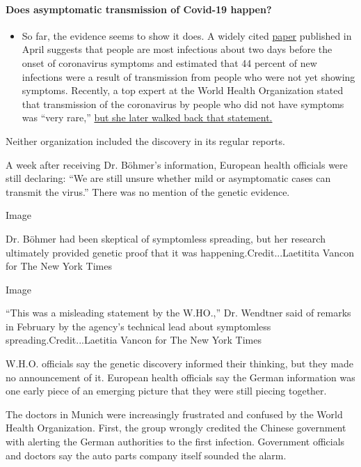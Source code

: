 \begin{itemize}
{  \paragraph{Does asymptomatic transmission of Covid-19
  happen?}\label{does-asymptomatic-transmission-of-covid-19-happen}}

  \begin{itemize}
  \tightlist
  \item
    So far, the evidence seems to show it does. A widely cited
    \href{https://www.nature.com/articles/s41591-020-0869-5}{paper}
    published in April suggests that people are most infectious about
    two days before the onset of coronavirus symptoms and estimated that
    44 percent of new infections were a result of transmission from
    people who were not yet showing symptoms. Recently, a top expert at
    the World Health Organization stated that transmission of the
    coronavirus by people who did not have symptoms was ``very rare,''
    \href{https://www.nytimes.com/2020/06/09/world/coronavirus-updates.html?action=click\&pgtype=Article\&state=default\&region=MAIN_CONTENT_3\&context=storylines_faq\#link-1f302e21}{but
    she later walked back that statement.}
  \end{itemize}
\end{itemize}

Neither organization included the discovery in its regular reports.

A week after receiving Dr. Böhmer's information, European health
officials were still declaring: ``We are still unsure whether mild or
asymptomatic cases can transmit the virus.'' There was no mention of the
genetic evidence.

Image

Dr. Böhmer had been skeptical of symptomless spreading, but her research
ultimately provided genetic proof that it was
happening.Credit...Laetitita Vancon for The New York Times

Image

``This was a misleading statement by the W.HO.,'' Dr. Wendtner said of
remarks in February by the agency's technical lead about symptomless
spreading.Credit...Laetitia Vancon for The New York Times

W.H.O. officials say the genetic discovery informed their thinking, but
they made no announcement of it. European health officials say the
German information was one early piece of an emerging picture that they
were still piecing together.

The doctors in Munich were increasingly frustrated and confused by the
World Health Organization. First, the group wrongly credited the Chinese
government with alerting the German authorities to the first infection.
Government officials and doctors say the auto parts company itself
sounded the alarm.

